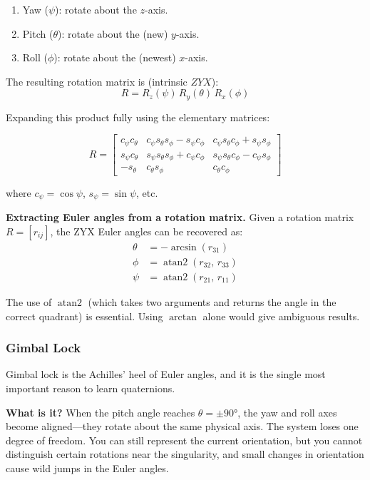 \begin{enumerate}[nosep]
    \item Yaw ($\psi$): rotate about the $z$-axis.
    \item Pitch ($\theta$): rotate about the (new) $y$-axis.
    \item Roll ($\phi$): rotate about the (newest) $x$-axis.
\end{enumerate}

The resulting rotation matrix is (intrinsic $ZYX$):
\begin{equation}
R = R_z(\psi) \, R_y(\theta) \, R_x(\phi)
\end{equation}

Expanding this product fully using the elementary matrices:

\begin{equation}
R = \begin{bmatrix}
c_\psi c_\theta & c_\psi s_\theta s_\phi - s_\psi c_\phi & c_\psi s_\theta c_\phi + s_\psi s_\phi \\
s_\psi c_\theta & s_\psi s_\theta s_\phi + c_\psi c_\phi & s_\psi s_\theta c_\phi - c_\psi s_\phi \\
-s_\theta & c_\theta s_\phi & c_\theta c_\phi
\end{bmatrix}
\end{equation}

where $c_\psi = \cos\psi$, $s_\psi = \sin\psi$, etc.

\textbf{Extracting Euler angles from a rotation matrix.} Given a rotation matrix $R = [r_{ij}]$, the ZYX Euler angles can be recovered as:
\begin{align}
\theta &= -\arcsin(r_{31}) \\
\phi &= \operatorname{atan2}(r_{32}, \, r_{33}) \\
\psi &= \operatorname{atan2}(r_{21}, \, r_{11})
\end{align}

The use of $\operatorname{atan2}$ (which takes two arguments and returns the angle in the correct quadrant) is essential. Using $\arctan$ alone would give ambiguous results.

\subsubsection{Gimbal Lock}

Gimbal lock is the Achilles' heel of Euler angles, and it is the single most important reason to learn quaternions.

\textbf{What is it?} When the pitch angle reaches $\theta = \pm 90°$, the yaw and roll axes become aligned---they rotate about the same physical axis. The system loses one degree of freedom. You can still represent the current orientation, but you cannot distinguish certain rotations near the singularity, and small changes in orientation cause wild jumps in the Euler angles.

